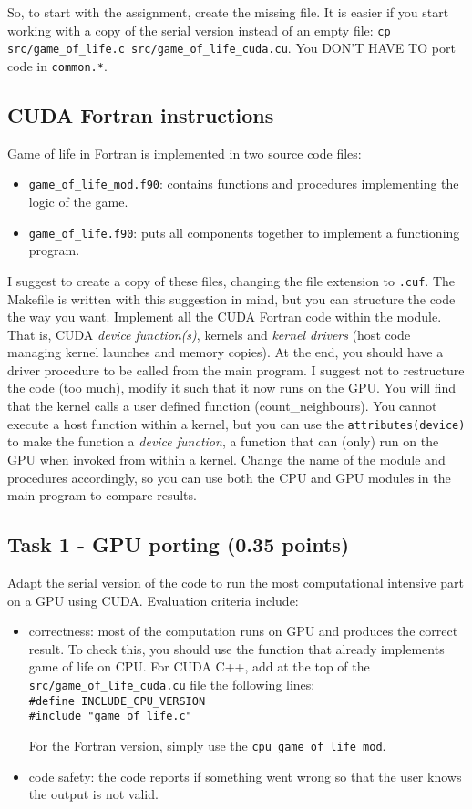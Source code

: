 \documentclass[a4paper, 11pt]{article}
\begin{document}
	So, to start with the assignment, create the missing file. It is easier if you start working with a copy of the serial version instead of an empty file: \texttt{cp src/game\_of\_life.c src/game\_of\_life\_cuda.cu}. You DON'T HAVE TO port code in \texttt{common.*}.
	
	\subsection{CUDA Fortran instructions}
	
	Game of life in Fortran is implemented in two source code files:
	\begin{itemize}
		\item \texttt{game\_of\_life\_mod.f90}: contains functions and procedures implementing the logic of the game.
		\item \texttt{game\_of\_life.f90}: puts all components together to implement a functioning program.
	\end{itemize}
	
	I suggest to create a copy of these files, changing the file extension to \texttt{.cuf}. The Makefile is written with this suggestion in mind, but you can structure the code the way you want.
	Implement all the CUDA Fortran code within the module. That is, CUDA \emph{device function(s)}, kernels and \emph{kernel drivers} (host code managing kernel launches and memory copies). At the end, you should have a driver procedure to be called from the main program. I suggest not to restructure the code (too much), modify it such that it now runs on the GPU. You will find that the kernel calls a user defined function (count\_neighbours). You cannot execute a host function within a kernel, but you can use the \texttt{attributes(device)} to make the function a \emph{device function}, a function that can (only) run on the GPU when invoked from within a kernel. Change the name of the module and procedures accordingly, so you can use both the CPU and GPU modules in the main program to compare results.
	
	
	\subsection{Task 1 - GPU porting (0.35 points)}
	Adapt the serial version of the code to run the most computational intensive part on a GPU using CUDA. Evaluation criteria include:
	\begin{itemize}
		\item correctness: most of the computation runs on GPU and produces the correct result. To check this, you should use the function that already implements game of life on CPU. For CUDA C++, add at the top of the \texttt{src/game\_of\_life\_cuda.cu} file the following lines:\\
		\texttt{\#define INCLUDE\_CPU\_VERSION}\\
		\texttt{\#include "game\_of\_life.c"}
		
		For the Fortran version, simply use the \texttt{cpu\_game\_of\_life\_mod}.
		\item code safety: the code reports if something went wrong so that the user knows the output is not valid.
	\end{itemize}
\end{document}
